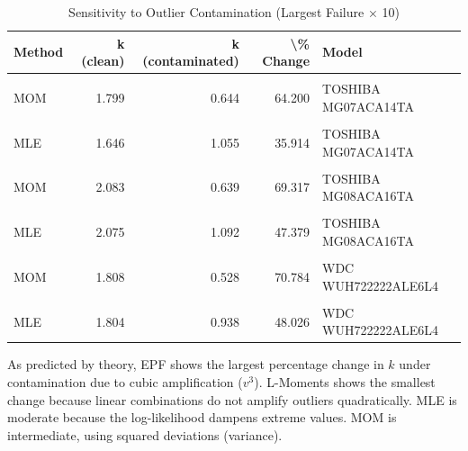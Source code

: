 \documentclass[
]{article}
\begin{document}
\begin{longtable}[t]{lrrrl}
\caption{\label{tab:sensitivity-section}Sensitivity to Outlier Contamination (Largest Failure × 10)}\\
\toprule
Method & k (clean) & k (contaminated) & \textbackslash{}\% Change & Model\\
\midrule
\cellcolor{gray!10}{EPF} & \cellcolor{gray!10}{1.921} & \cellcolor{gray!10}{0.566} & \cellcolor{gray!10}{70.549} & \cellcolor{gray!10}{TOSHIBA MG07ACA14TA}\\
MOM & 1.799 & 0.644 & 64.200 & TOSHIBA MG07ACA14TA\\
\cellcolor{gray!10}{L-Moments} & \cellcolor{gray!10}{1.719} & \cellcolor{gray!10}{1.265} & \cellcolor{gray!10}{26.452} & \cellcolor{gray!10}{TOSHIBA MG07ACA14TA}\\
MLE & 1.646 & 1.055 & 35.914 & TOSHIBA MG07ACA14TA\\
\cellcolor{gray!10}{EPF} & \cellcolor{gray!10}{2.202} & \cellcolor{gray!10}{0.574} & \cellcolor{gray!10}{73.933} & \cellcolor{gray!10}{TOSHIBA MG08ACA16TA}\\
\addlinespace
MOM & 2.083 & 0.639 & 69.317 & TOSHIBA MG08ACA16TA\\
\cellcolor{gray!10}{L-Moments} & \cellcolor{gray!10}{2.013} & \cellcolor{gray!10}{1.329} & \cellcolor{gray!10}{33.986} & \cellcolor{gray!10}{TOSHIBA MG08ACA16TA}\\
MLE & 2.075 & 1.092 & 47.379 & TOSHIBA MG08ACA16TA\\
\cellcolor{gray!10}{EPF} & \cellcolor{gray!10}{1.879} & \cellcolor{gray!10}{0.524} & \cellcolor{gray!10}{72.114} & \cellcolor{gray!10}{WDC WUH722222ALE6L4}\\
MOM & 1.808 & 0.528 & 70.784 & WDC WUH722222ALE6L4\\
\addlinespace
\cellcolor{gray!10}{L-Moments} & \cellcolor{gray!10}{1.747} & \cellcolor{gray!10}{0.971} & \cellcolor{gray!10}{44.413} & \cellcolor{gray!10}{WDC WUH722222ALE6L4}\\
MLE & 1.804 & 0.938 & 48.026 & WDC WUH722222ALE6L4\\
\bottomrule
\end{longtable}

As predicted by theory, EPF shows the largest percentage change in \(k\)
under contamination due to cubic amplification (\(v^3\)). L-Moments
shows the smallest change because linear combinations do not amplify
outliers quadratically. MLE is moderate because the log-likelihood
dampens extreme values. MOM is intermediate, using squared deviations
(variance).
\end{document}
